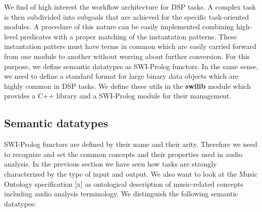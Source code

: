 \documentclass[runningheads]{llncs}
\begin{document}
We find of high interest the workflow architecture for DSP tasks. A complex task is then subdivided into subgoals that are achieved for the specific task-oriented modules. A procedure of this nature can be easily implemented combining high-level predicates with a proper matching of the instantation patterns. These instantation patters must have terms in common which are easily carried forward from one module to another without worring about further conversion. For this purpose, we define semantic datatypes as SWI-Prolog functors. In the same sense, we need to define a standard format for large binary data objects which are highly common in DSP tasks. We define these utils in the \textbf{swilib} module which provides a C++ library and a SWI-Prolog module for their management.

\subsection{Semantic datatypes}\label{subsec:datatypes}

SWI-Prolog functors are defined by their name and their arity. Therefore we need to recognize and set the common concepts and their properties used in audio analysis. In the previous section we have seen how tasks are strongly characterized by the type of input and output. We also want to look at the Music Ontology specification [x] as ontological description of music-related concepts including audio analysis terminology. We distinguish the following semantic datatypes:
\end{document}
